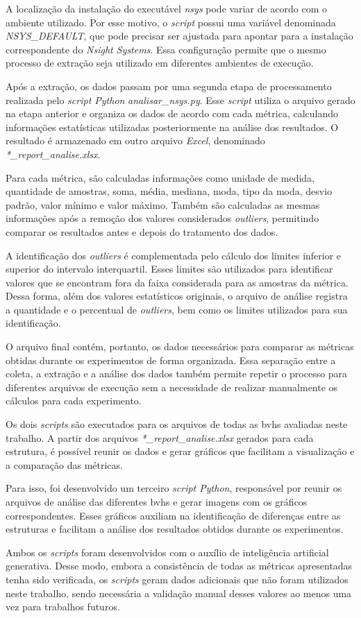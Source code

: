 A localização da instalação do executável \textit{nsys} pode variar de acordo com o ambiente utilizado. Por esse motivo, o \textit{script} possui uma variável denominada \textit{NSYS\_DEFAULT}, que pode precisar ser ajustada para apontar para a instalação correspondente do \textit{Nsight Systems}. Essa configuração permite que o mesmo processo de extração seja utilizado em diferentes ambientes de execução.

Após a extração, os dados passam por uma segunda etapa de processamento realizada pelo \textit{script Python} \textit{analisar\_nsys.py}. Esse \textit{script} utiliza o arquivo gerado na etapa anterior e organiza os dados de acordo com cada métrica, calculando informações estatísticas utilizadas posteriormente na análise dos resultados. O resultado é armazenado em outro arquivo \textit{Excel}, denominado \textit{*\_report\_analise.xlsx}.

Para cada métrica, são calculadas informações como unidade de medida, quantidade de amostras, soma, média, mediana, moda, tipo da moda, desvio padrão, valor mínimo e valor máximo. Também são calculadas as mesmas informações após a remoção dos valores considerados \textit{outliers}, permitindo comparar os resultados antes e depois do tratamento dos dados.

A identificação dos \textit{outliers} é complementada pelo cálculo dos limites inferior e superior do intervalo interquartil. Esses limites são utilizados para identificar valores que se encontram fora da faixa considerada para as amostras da métrica. Dessa forma, além dos valores estatísticos originais, o arquivo de análise registra a quantidade e o percentual de \textit{outliers}, bem como os limites utilizados para sua identificação.

O arquivo final contém, portanto, os dados necessários para comparar as métricas obtidas durante os experimentos de forma organizada. Essa separação entre a coleta, a extração e a análise dos dados também permite repetir o processo para diferentes arquivos de execução sem a necessidade de realizar manualmente os cálculos para cada experimento.

Os dois \textit{scripts} são executados para os arquivos de todas as \glspl{bvh} avaliadas neste trabalho. A partir dos arquivos \textit{*\_report\_analise.xlsx} gerados para cada estrutura, é possível reunir os dados e gerar gráficos que facilitam a visualização e a comparação das métricas.

Para isso, foi desenvolvido um terceiro \textit{script Python}, responsável por reunir os arquivos de análise das diferentes \glspl{bvh} e gerar imagens com os gráficos correspondentes. Esses gráficos auxiliam na identificação de diferenças entre as estruturas e facilitam a análise dos resultados obtidos durante os experimentos.

Ambos os \textit{scripts} foram desenvolvidos com o auxílio de inteligência artificial generativa. Desse modo, embora a consistência de todas as métricas apresentadas tenha sido verificada, os \textit{scripts} geram dados adicionais que não foram utilizados neste trabalho, sendo necessária a validação manual desses valores ao menos uma vez para trabalhos futuros.